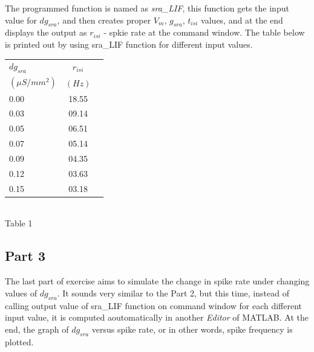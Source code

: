 \documentclass{article}
\begin{document}
The programmed function is named as \textit{sra\_LIF}, this function gets the input value for $dg_{sra}$, and then creates proper $V_{m}$, $g_{sra}$, $t_{isi}$ values,  and at the end displays the output as $r_{isi}$ - spkie rate at the command window. The table below is printed out by using sra\_LIF function for different input values. \\

\begin {table} [h]
 \begin{center}
  \begin{tabular}{ l | c | r }

    
$dg_{sra}$ & $r_{isi}$ \\
$(\mu S/mm^{2})$ & $(Hz)$
 \\ \hline \hline
 
    0.00 & 18.55 \\ \hline
    0.03 & 09.14 \\ \hline
    0.05 & 06.51 \\ \hline
    0.07 & 05.14 \\ \hline
    0.09 & 04.35 \\ \hline
    0.12 & 03.63 \\ \hline
    0.15 & 03.18 \\ \hline

  \end{tabular}

 
\begin{footnotesize} 
$ $\\ Table 1  
 \end{footnotesize}

\end{center}
\end{table}



\begin{center}
\section*{Part 3} 
\end{center}

The last part of exercise aims to simulate the change in spike rate under changing values of $dg_{sra}$. It sounds very similar to the Part 2, but this time, instead of calling output value of sra\_LIF function on command window for each different input value, it is computed aoutomatically in another \textit{Editor} of MATLAB. At the end, the graph of $dg_{sra}$ versus spike rate, or in other words, spike frequency is plotted. \\
\end{document}
